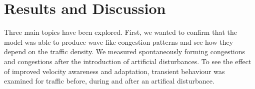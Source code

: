 \documentclass[11pt,a4paper,twocolumn]{article}
\begin{document}
\section{Results and Discussion}\label{sec:results}
Three main topics have been explored. First, we wanted to confirm that the model was able to produce wave-like congestion patterns and see how they depend on the traffic density. We measured spontaneously forming congestions and congestions after the introduction of artificial disturbances. To see the effect of improved velocity awareness and adaptation, transient behaviour was examined for traffic before, during and after an artifical disturbance. 




\end{document}
